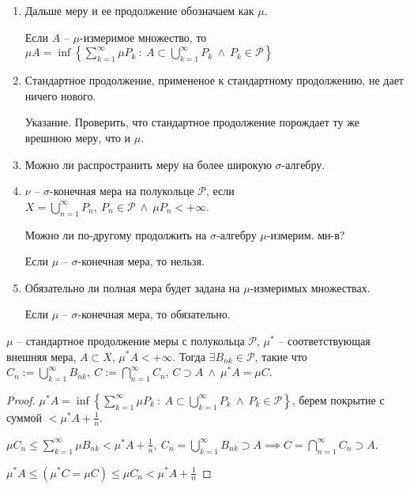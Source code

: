 \begin{remark}
    \begin{enumerate}
        \item {
            Дальше меру и ее продолжение обозначаем как $\mu$.

            Если $A$ -- $\mu$-измеримое множество, то $\mu A = \inf \left\{ \sum_{k=1}^{\infty} \mu P_k \ : \ A \subset \bigcup_{k=1}^{\infty} P_k \ \land \ P_k \in \mathcal{P} \right\}$
        }
        \item {
            Стандартное продолжение, примененое к стандартному продолжению, не дает ничего нового.

            \begin{exerc}
                Указание. Проверить, что стандартное продолжение порождает ту же врешнюю меру, что и $\mu$.
            \end{exerc}
        }
        \item {
            Можно ли распространить меру на более широкую $\sigma$-алгебру.
        }
        \item {
            \begin{definition}
                $\nu$ -- $\sigma$-конечная мера на полукольце $\mathcal{P}$, если $X = \bigcup_{n=1}^{\infty}P_n, \ P_n \in \mathcal{P} \ \land \ \mu P_n < +\infty$.
            \end{definition}
            
            Можно ли по-другому продолжить на $\sigma$-алгебру $\mu$-измерим. мн-в?

            Если $\mu$ -- $\sigma$-конечная мера, то нельзя.
        }
        \item {
            Обязательно ли полная мера будет задана на $\mu$-измеримых множествах.

            Если $\mu$ -- $\sigma$-конечная мера, то обязательно.
        }
    \end{enumerate}
\end{remark}


\begin{theorem}
    $\mu$ -- стандартное продолжение меры с полукольца $\mathcal{P}$, $\mu^*$ -- соответствующая внешняя мера, $A \subset X$, $\mu^* A < + \infty$. Тогда $\exists B_{nk} \in \mathcal{P}$, такие что $C_{n} := \bigcup_{k=1}^{\infty} B_{nk}, \ C := \bigcap_{n=1}^{\infty} C_n$, $C \supset A \ \land \ \mu^* A = \mu C$.
\end{theorem}
\begin{proof}
    $\mu^* A = \inf \left\{ \sum_{k=1}^{\infty} \mu P_k \ : \ A \subset \bigcup_{k=1}^{\infty} P_k \ \land \ P_k \in \mathcal{P} \right\}$, берем покрытие с суммой $< \mu^* A + \frac{1}{n}$.

    $\mu C_n \leq \sum_{k=1}^{\infty} \mu B_{nk} < \mu^* A + \frac{1}{n}, \ C_n = \bigcup_{k=1}^{\infty} B_{nk} \supset A \implies C = \bigcap_{n=1}^{\infty} C_n \supset A$.

    $\mu^*A \leq (\mu^* C = \mu C) \leq \mu C_n < \mu^* A + \frac{1}{n}$
\end{proof}

